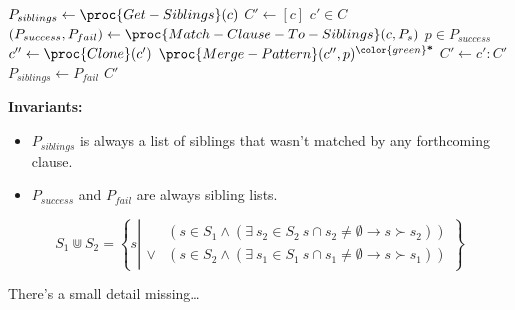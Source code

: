 \begin{frame}[fragile]

\begin{codebox}
\li $P_{siblings} \gets \proc{Get-Siblings}(c)$
\li $C' \gets [c]$
\li \For $c'\in C$ \Do
\li $(P_{success},P_{fail}) \gets \proc{Match-Clause-To-Siblings}(c,P_s)$
\li \For $p\in P_{success}$ \Do
\li $c'' \gets \proc{Clone}(c')$
\li $\proc{Merge-Pattern}(c'',p)^{\color{green}\textt{\bf *}}$
\li $C' \gets c' : C'$ \End
\li $P_{siblings} \gets P_{fail}$ \End
\li \Return $C'$
\end{codebox}

{\bf Invariants:}

\begin{itemize}

\item \bi $P_{siblings}$ is always a list of siblings that wasn't matched by
any forthcoming clause.

\item \bi $P_{success}$ and $P_{fail}$ are always sibling lists.

\end{itemize}

\end{frame}

\begin{frame}

$$S_1\Cup S_2 = \left\{ s \left|
\begin{array}{ll} &\left(s\in S_1 \wedge \left(\exists\ s_2\in S_2\ s\cap
s_2\neq\emptyset \longrightarrow s\succ s_2 \right) \right)\\ \vee & \left( s\in
S_2 \wedge \left(\exists\ s_1\in S_1\ s\cap s_1\neq\emptyset \longrightarrow
s\succ s_1 \right) \right) \end{array} \right.\right\}$$

\vspace{0.5in}

\begin{center}

There's a small detail missing\ldots

\end{center}

\end{frame}
